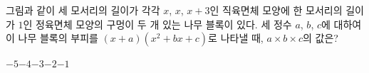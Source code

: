 그림과 같이 세 모서리의 길이가 각각 $x$, $x$, $x+3$인 직육면체 모양에 한 모서리의 길이가 $1$인 정육면체 모양의 구멍이 두 개 있는 나무 블록이 있다. 세 정수 $a$, $b$, $c$에 대하여 이 나무 블록의 부피를 $(x+a)(x^2+bx+c)$로 나타낼 때, $a\times b\times c$의 값은? 
\par\smallskip\begin{center}\resizebox{\ifdim\width>\linewidth\linewidth\else\width\fi}{!}{}\end{center}
\begin{choices32}{$-5$}{$-4$}{$-3$}{$-2$}{$-1$}\end{choices32}
